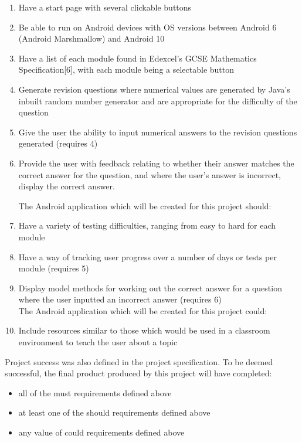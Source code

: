 \documentclass{article}
\begin{document}
\begin{enumerate}
	\item Have a start page with several clickable buttons
	\item Be able to run on Android devices with OS versions between Android 6 (Android Marshmallow) and Android 10
	\item Have a list of each module found in Edexcel's GCSE Mathematics Specification[6], with each module being a selectable button
	\item Generate revision questions where numerical values are generated by Java's inbuilt random number generator and are appropriate for the difficulty of the question
	\item Give the user the ability to input numerical answers to the revision questions generated (requires 4)
	\item Provide the user with feedback relating to whether their answer matches the correct answer for the question, and where the user’s answer is incorrect, display the correct answer. \par
	
	The Android application which will be created for this project should:
	\item Have a variety of testing difficulties, ranging from easy to hard for each module
	\item Have a way of tracking user progress over a number of days or tests per module (requires 5)
	\item Display model methods for working out the correct answer for a question where the user inputted an incorrect answer (requires 6) \\
	
	The Android application which will be created for this project could:
	\item Include resources similar to those which would be used in a classroom environment to teach the user about a topic
\end{enumerate}

Project success was also defined in the project specification. To be deemed successful, the final product produced by this project will have completed: 

\begin{itemize}
	\item all of the must requirements defined above
	\item at least one of the should requirements defined above
	\item any value of could requirements defined above
\end{itemize}
\end{document}
